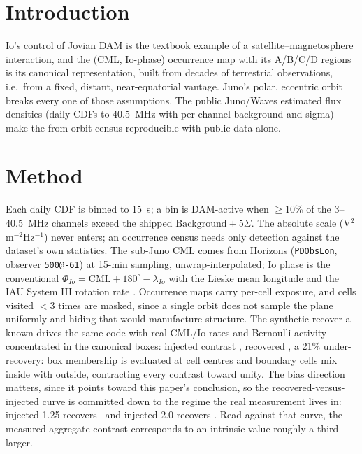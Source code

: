 \documentclass[twocolumn]{aastex631}
\newcommand{\code}[1]{\texttt{#1}}
\begin{document}

\section{Introduction}
Io's control of Jovian DAM \citep{bigg1964} is the textbook example of a satellite--magnetosphere
interaction, and the (CML, Io-phase) occurrence map with its A/B/C/D regions \citep{carr1983,
marques2017} is its canonical representation, built from decades of terrestrial
observations, i.e.\ from a fixed, distant, near-equatorial vantage. Juno's polar, eccentric orbit
breaks every one of those assumptions. The public Juno/Waves estimated flux densities
\citep[version 02, 2023;][]{louis2021} (daily CDFs to 40.5~MHz with per-channel background and
sigma) make the from-orbit census reproducible with public data alone.

\section{Method}
Each daily CDF is binned to 15~s; a bin is DAM-active when $\ge$10\% of the 3--40.5~MHz channels
exceed the shipped $\mathrm{Background}+5\Sigma$. The absolute scale (V$^2$m$^{-2}$Hz$^{-1}$)
never enters; an occurrence census needs only detection against the dataset's own statistics.
The sub-Juno CML comes from Horizons (\code{PDObsLon}, observer \code{500@-61}) at 15-min
sampling, unwrap-interpolated; Io phase is the conventional $\Phi_{Io} = \mathrm{CML} + 180^\circ - \lambda_{Io}$ with the
Lieske mean longitude \citep{lieske1987} and the IAU System III rotation rate
\citep{archinal2018}. Occurrence maps carry per-cell exposure, and cells visited $<$3 times are
masked, since a single orbit does not sample the plane uniformly and hiding that would manufacture
structure. The synthetic recover-a-known drives the same code with real CML/Io rates and
Bernoulli activity concentrated in the canonical boxes: injected contrast \jdSynExpContrast,
recovered \jdSynContrast, a 21\% under-recovery: box membership is evaluated at
cell centres and boundary cells mix inside with outside, contracting every contrast toward
unity. The bias direction matters, since it points toward this paper's conclusion, so the
recovered-versus-injected curve is committed down to the regime the real measurement lives in:
injected 1.25 recovers \jdSynRecNearUnity\ and injected 2.0 recovers \jdSynRecMid. Read
against that curve, the measured aggregate contrast corresponds to an intrinsic value roughly a
third larger.
\end{document}
